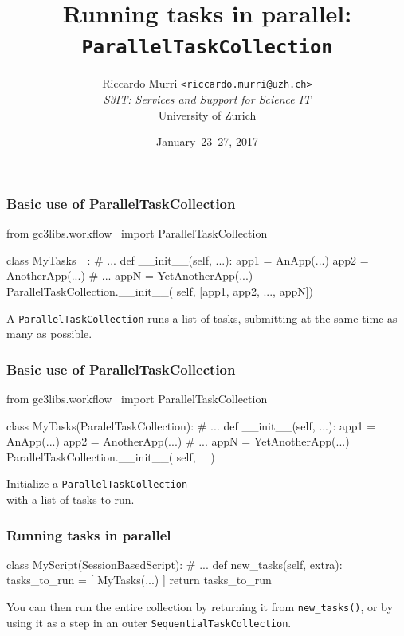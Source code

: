 \documentclass[english,serif,mathserif,xcolor=pdftex,dvipsnames,table]{beamer}
\title[Sequencing tasks]{%
  Running tasks in parallel: \\
  \texttt{ParallelTaskCollection}
}
\author[R. Murri, S3IT UZH]{%
  Riccardo Murri \texttt{<riccardo.murri@uzh.ch>}
  \\[1ex]
  \emph{S3IT: Services and Support for Science IT}
  \\[1ex]
  University of Zurich
}
\date{January~23--27, 2017}
\begin{document}
\maketitle


\begin{frame}[fragile]
  \frametitle{Basic use of ParallelTaskCollection}

\begin{python}
from gc3libs.workflow \
  import ParallelTaskCollection

class MyTasks~~:
  # ...
  def __init__(self, ...):
    app1 = AnApp(...)
    app2 = AnotherApp(...)
    # ...
    appN = YetAnotherApp(...)
    ParallelTaskCollection.__init__(
      self, [app1, app2, ..., appN])
\end{python}

  \+ A \texttt{ParallelTaskCollection} runs a list of tasks, submitting
  at the same time as many as possible.
\end{frame}


\begin{frame}[fragile]
  \frametitle{Basic use of ParallelTaskCollection}

\begin{python}
from gc3libs.workflow \
  import ParallelTaskCollection

class MyTasks(ParalelTaskCollection):
  # ...
  def __init__(self, ...):
    app1 = AnApp(...)
    app2 = AnotherApp(...)
    # ...
    appN = YetAnotherApp(...)
    ParallelTaskCollection.__init__(
      self, ~~)
\end{python}

  \+
  Initialize a \texttt{ParallelTaskCollection} \\
  with a list of tasks to run.
\end{frame}


\begin{frame}[fragile]
  \frametitle{Running tasks in parallel}

\begin{python}
class MyScript(SessionBasedScript):
  # ...
  def new_tasks(self, extra):
    tasks_to_run = [
      MyTasks(...)
    ]
    return tasks_to_run
\end{python}

  \+ You can then run the entire collection by returning it from
  \lstinline|new_tasks()|, or by using it as a step in an outer
  \texttt{SequentialTaskCollection}.
\end{frame}
\end{document}
